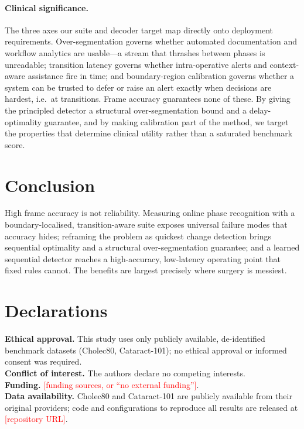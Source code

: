 \documentclass[11pt]{article}
\newcommand{\todo}[1]{\textcolor{red}{[#1]}}
\begin{document}
\paragraph{Clinical significance.} The three axes our suite and decoder target map directly
onto deployment requirements. Over-segmentation governs whether automated documentation and
workflow analytics are usable---a stream that thrashes between phases is unreadable;
transition latency governs whether intra-operative alerts and context-aware assistance fire
in time; and boundary-region calibration governs whether a system can be trusted to defer or
raise an alert exactly when decisions are hardest, i.e.\ at transitions. Frame accuracy
guarantees none of these. By giving the principled detector a structural over-segmentation
bound and a delay-optimality guarantee, and by making calibration part of the method, we
target the properties that determine clinical utility rather than a saturated benchmark score.

\section{Conclusion}
High frame accuracy is not reliability. Measuring online phase recognition with a
boundary-localised, transition-aware suite exposes universal failure modes that
accuracy hides; reframing the problem as quickest change detection brings sequential
optimality and a structural over-segmentation guarantee; and a learned sequential
detector reaches a high-accuracy, low-latency operating point that fixed rules
cannot. The benefits are largest precisely where surgery is messiest.

\section*{Declarations}
\noindent\textbf{Ethical approval.} This study uses only publicly available, de-identified
benchmark datasets (Cholec80, Cataract-101); no ethical approval or informed consent was
required.\\
\noindent\textbf{Conflict of interest.} The authors declare no competing interests.\\
\noindent\textbf{Funding.} \todo{funding sources, or ``no external funding''}.\\
\noindent\textbf{Data availability.} Cholec80 and Cataract-101 are publicly available from
their original providers; code and configurations to reproduce all results are released at
\todo{repository URL}.
\end{document}
